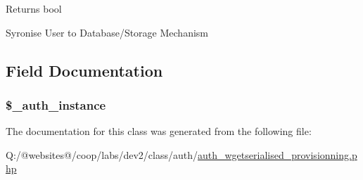 \begin{DoxyReturn}{Returns}
bool 
\end{DoxyReturn}
Syronise User to Database/\-Storage Mechanism

\subsection{Field Documentation}
\hypertarget{class_xortify_auth_wgetserialised_provisionning_a486ed878bb5a7188c99ac4c9ee46ac6e}{
\subsubsection[{\$\-\_\-auth\-\_\-instance}]{\setlength{\rightskip}{0pt plus 5cm}\$\-\_\-auth\-\_\-instance}}\label{class_xortify_auth_wgetserialised_provisionning_a486ed878bb5a7188c99ac4c9ee46ac6e}


The documentation for this class was generated from the following file\-:\begin{DoxyCompactItemize}
\item 
Q\-:/@websites@/coop/labs/dev2/class/auth/\hyperlink{auth__wgetserialised__provisionning_8php}{auth\-\_\-wgetserialised\-\_\-provisionning.\-php}\end{DoxyCompactItemize}

